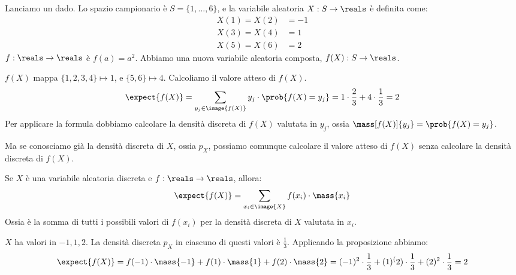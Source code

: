 \begin{exmp}
Lanciamo un dado. Lo spazio campionario \`e $S = \{1, \ldots, 6\}$, e la variabile aleatoria $X : S \to \reals$ \`e definita come:
\begin{align*}
X(1) = X(2) &= -1 \\
X(3) = X(4) &= 1 \\
X(5) = X(6) &= 2
\end{align*}
$f : \reals \to \reals$ \`e $f(a) = a^2$. Abbiamo una nuova variabile aleatoria composta, $f(X) : S \to \reals$.

$f(X)$ mappa $\{1, 2, 3, 4\} \mapsto 1$, e $\{5, 6\} \mapsto 4$. Calcoliamo il valore atteso di $f(X)$.
\[
\expect{f(X)} = \sum_{y_j \in \image{f(X)}} y_j \cdot \prob{f(X) = y_j} = 
1 \cdot \frac{2}{3} + 4 \cdot \frac{1}{3} = 2
\]
Per applicare la formula dobbiamo calcolare la densit\`a discreta di $f(X)$ valutata in $y_j$, ossia $\mass[f(X)]{y_j} = \prob{f(X) = y_j}$.

Ma se conosciamo gi\`a la densit\`a discreta di $X$, ossia $p_X$, possiamo comunque calcolare il valore atteso di $f(X)$ senza calcolare la densit\`a discreta di $f(X)$.
\begin{prop}
Se $X$ \`e una variabile aleatoria discreta e $f : \reals \to \reals$, allora:
\[
\expect{f(X)} = \sum_{x_i \in \image{X}} f(x_i) \cdot \mass{x_i}
\]
Ossia \`e la somma di tutti i possibili valori di $f(x_i)$ per la densit\`a discreta di $X$ valutata in $x_i$. 
\end{prop}
$X$ ha valori in $-1, 1, 2$. La densit\`a discreta $p_X$ in ciascuno di questi valori \`e $\frac{1}{3}$. Applicando la proposizione abbiamo:
\[
\expect{f(X)} = f(-1) \cdot \mass{-1} + f(1) \cdot \mass{1} + f(2) \cdot \mass{2} = 
(-1)^{2} \cdot \frac{1}{3} + (1)^(2) \cdot \frac{1}{3} + (2)^2 \cdot \frac{1}{3} = 2
\]
\end{exmp}
